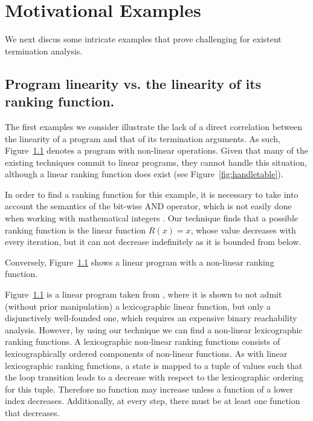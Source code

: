 \documentclass[preprint]{sigplanconf}
\theoremstyle{definition}
\begin{document}

\section{Motivational Examples} 
We next discus some intricate examples that prove challenging for existent termination analysis.


\subsection{Program linearity vs. the linearity of its ranking function.}
The first examples we consider illustrate the lack of a direct correlation between the linearity of a program and that of its termination arguments.
As such, Figure~\ref{} denotes a program with non-linear operations. Given that  many of the existing techniques commit to linear programs, they cannot handle this situation, 
although a linear ranking function does exist (see Figure~\ref{fig:handletable}). 

In order to find a ranking function for this example, it is necessary to take into account
the semantics of the bit-wise AND operator, which is not easily done when working with mathematical integers \cite{}.
Our technique finds that a possible ranking function is the linear function
$R(x) = x$, whose value decreases with
every iteration, but it can not decrease indefinitely as it is bounded from below.

Conversely, Figure~\ref{} shows a linear program with a non-linear ranking function.

Figure~\ref{} is a linear program taken from \cite{DBLP:conf/tacas/CookSZ13}, where it is shown to not admit (without prior manipulation) a lexicographic linear function, but only a disjunctively well-founded one, 
which requires an expensive binary reachability analysis.
However, by using our technique we can find a non-linear lexicographic ranking functions.
A lexicographic non-linear ranking functions consists of lexicographically ordered components
of non-linear functions. As with linear lexicographic ranking functions, a state is mapped to a tuple of values such that the
loop transition leads to a decrease with respect to the lexicographic
ordering for this tuple. Therefore no function may increase unless a function of
a lower index decreases. Additionally, at every step, there must be at least one
function that decreases.
\end{document}
